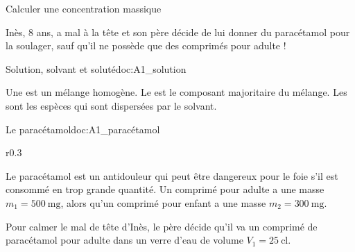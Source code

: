 \teteSndSolu

\vspace*{-36pt}

\begin{objectifs}
  \item Calculer une concentration massique
\end{objectifs}


\begin{contexte}
  Inès, 8 ans, a mal à la tête et son père décide de lui donner du paracétamol pour la soulager, sauf qu'il ne possède que des comprimés pour adulte !

\end{contexte}


\begin{doc}{Solution, solvant et soluté}{doc:A1_solution}
  \begin{encart}
    Une  est un mélange homogène.
    Le  est le composant majoritaire du mélange.
    Les  sont les espèces qui sont dispersées par le solvant.
    \begin{center}
    \end{center}
  \end{encart}
\end{doc}

\begin{doc}{Le paracétamol}{doc:A1_paracétamol}
  \begin{wrapfigure}[5]{r}{0.3\linewidth}
    \vspace*{-30pt}
    \centering
  \end{wrapfigure}
  
  Le paracétamol est un antidouleur qui peut être dangereux pour le foie s'il est consommé en trop grande quantité.
  Un comprimé pour adulte a une masse $m_1 = \qty{500}{\milli\g}$, alors qu'un comprimé pour enfant a une masse $m_2 = \qty{300}{\milli\g}$.
  
  Pour calmer le mal de tête d'Inès, le père décide qu'il va  un comprimé de paracétamol pour adulte dans un verre d'eau de volume $V_1 = \qty{25}{\centi\litre}$.
\end{doc}



